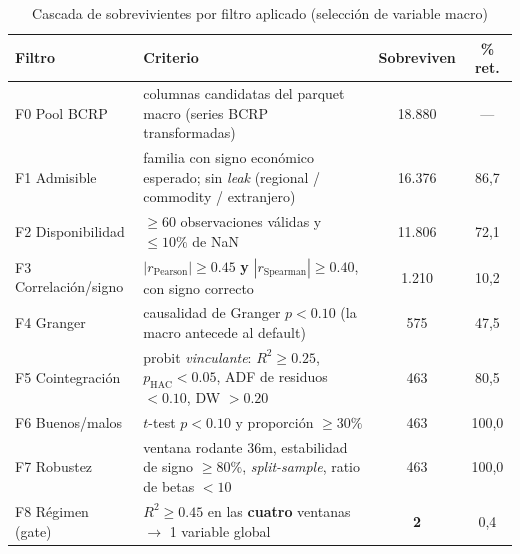 \documentclass[12pt, a4paper]{article}
\begin{document}
\begin{table}[H]
\centering
\caption{Cascada de sobrevivientes por filtro aplicado (selección de variable macro)}
\label{tab:funnel}
\small
\begin{tabular}{lp{7.2cm}cc}
\toprule
\textbf{Filtro} & \textbf{Criterio} & \textbf{Sobreviven} & \textbf{\% ret.} \\
\midrule
F0 Pool BCRP        & columnas candidatas del parquet macro (series BCRP transformadas)                          & 18.880 & --- \\
F1 Admisible        & familia con signo económico esperado; sin \emph{leak} (regional / commodity / extranjero)   & 16.376 & 86,7 \\
F2 Disponibilidad   & $\ge 60$ observaciones válidas y $\le 10\%$ de NaN                                          & 11.806 & 72,1 \\
F3 Correlación/signo& $|r_{\text{Pearson}}|\ge0.45$ \textbf{y} $|r_{\text{Spearman}}|\ge0.40$, con signo correcto & 1.210 & 10,2 \\
F4 Granger          & causalidad de Granger $p<0.10$ (la macro antecede al default)                              & 575 & 47,5 \\
F5 Cointegración    & probit \emph{vinculante}: $R^2\ge0.25$, $p_{\text{HAC}}<0.05$, ADF de residuos $<0.10$, DW $>0.20$ & 463 & 80,5 \\
F6 Buenos/malos     & $t$-test $p<0.10$ y proporción $\ge30\%$                                                    & 463 & 100,0 \\
F7 Robustez         & ventana rodante 36m, estabilidad de signo $\ge80\%$, \emph{split-sample}, ratio de betas $<10$ & 463 & 100,0 \\
F8 Régimen (gate)   & $R^2\ge0.45$ en las \textbf{cuatro} ventanas $\to$ 1 variable global                        & \textbf{2} & 0,4 \\
\bottomrule
\end{tabular}
\end{table}
\end{document}
